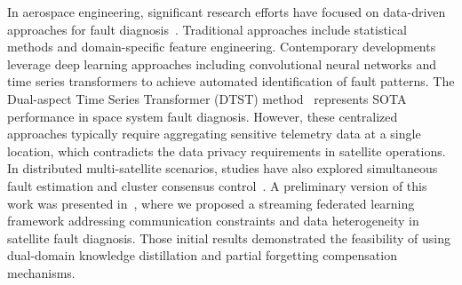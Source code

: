 In aerospace engineering, significant research efforts have focused on data-driven approaches for fault diagnosis~\cite{ganesan2021fault, xiao2020deep}. 
Traditional approaches include statistical methods and domain-specific feature engineering. 
Contemporary developments leverage deep learning approaches including convolutional neural networks and time series transformers to achieve automated identification of fault patterns. 
The Dual-aspect Time Series Transformer (DTST) method~\cite{xu2024dtst} represents SOTA performance in space system fault diagnosis. 
However, these centralized approaches typically require aggregating sensitive telemetry data at a single location, which contradicts the data privacy requirements in satellite operations.
In distributed multi-satellite scenarios, studies have also explored simultaneous fault estimation and cluster consensus control~\cite{10171456}.
A preliminary version of this work was presented in~\cite{xie2025fault}, where we proposed a streaming federated learning framework addressing communication constraints and data heterogeneity in satellite fault diagnosis. 
Those initial results demonstrated the feasibility of using dual-domain knowledge distillation and partial forgetting compensation mechanisms. 